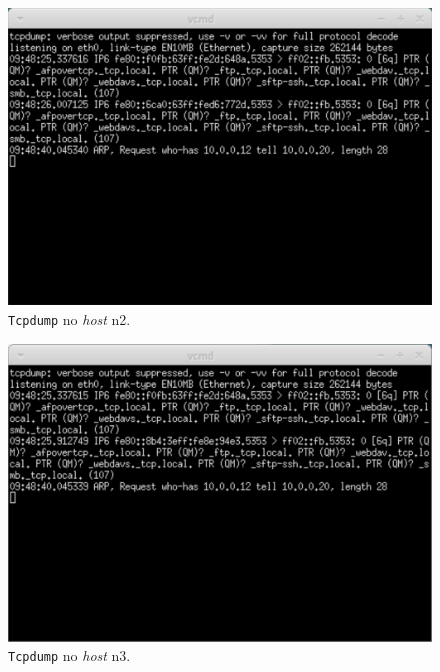 \documentclass{llncs}
\begin{document}
\begin{figure}
  \begin{center}
	  \includegraphics[scale=0.3]{./imagens/n2_tcpdump_comutador.png} 
  \end{center}
	\caption{\texttt{Tcpdump} no \textit{host} n2.}
  \label{fig:n2_comutador}
\end{figure} 

\begin{figure}
  \begin{center}
	  \includegraphics[scale=0.3]{./imagens/n3_tcpdump_comutador.png} 
  \end{center}
	\caption{\texttt{Tcpdump} no \textit{host} n3.}
  \label{fig:n3_comutador}
\end{figure} 
\end{document}
